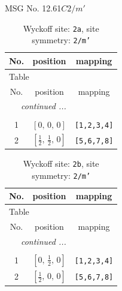 \documentclass[fleqn,8pt]{jsarticle}
\begin{document}
\setcounter{MaxMatrixCols}{32}

\renewcommand{\tablename}{Table~}
\renewcommand{\figurename}{Figure~}
\begin{center}
\LARGE
MSG No. 12.61\quad$C2/m'$
\end{center}
\renewcommand{\arraystretch}{1.2}
\begin{longtable}{ccc}
\caption{Wyckoff site: {\tt 2a}, site symmetry: {\tt 2/m'}}
 \\
 \hline \hline
No. & position & mapping \\ \hline \endfirsthead

\multicolumn{2}{l}{\tablename\ \thetable{}} \\
 \hline \hline
No. & position & mapping \\ \hline \endhead

 \hline \hline
\multicolumn{2}{r}{\footnotesize\it continued ...} \\ \endfoot

 \hline \hline
\multicolumn{2}{r}{} \\ \endlastfoot

1 & $\left[ 0,\, 0,\, 0 \right]$ & {\tt [1,2,3,4]} \\ \hline
2 & $\left[ \frac{1}{2},\, \frac{1}{2},\, 0 \right]$ & {\tt [5,6,7,8]} \\
\end{longtable}
\renewcommand{\arraystretch}{1.2}
\begin{longtable}{ccc}
\caption{Wyckoff site: {\tt 2b}, site symmetry: {\tt 2/m'}}
 \\
 \hline \hline
No. & position & mapping \\ \hline \endfirsthead

\multicolumn{2}{l}{\tablename\ \thetable{}} \\
 \hline \hline
No. & position & mapping \\ \hline \endhead

 \hline \hline
\multicolumn{2}{r}{\footnotesize\it continued ...} \\ \endfoot

 \hline \hline
\multicolumn{2}{r}{} \\ \endlastfoot

1 & $\left[ 0,\, \frac{1}{2},\, 0 \right]$ & {\tt [1,2,3,4]} \\ \hline
2 & $\left[ \frac{1}{2},\, 0,\, 0 \right]$ & {\tt [5,6,7,8]} \\
\end{longtable}
\renewcommand{\arraystretch}{1.2}
\end{document}
